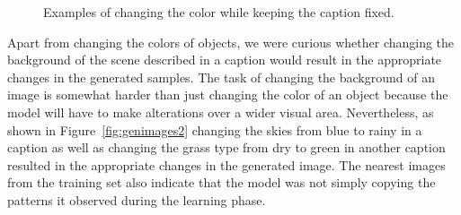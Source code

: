 \documentclass{article} %
\begin{document}
\begin{figure}[!h]
\captionsetup[subfigure]{labelformat=empty}
\begin{center}
\quad
%
\quad
%
\quad
%
\quad
%
\end{center}
\caption{Examples of changing the color while keeping the caption fixed.}
\label{fig:genimages1}
\vspace{-0.6cm}
\end{figure}

Apart from changing the colors of objects, we were curious whether changing the background of the scene described in a caption would result in the appropriate changes in the generated samples. The task of changing the background of an image is somewhat harder than just changing the color of an object because the model will have to make alterations over a wider visual area. Nevertheless, as shown in Figure~\ref{fig:genimages2} changing the skies from blue to rainy in a caption as well as changing the grass type from dry to green in another caption resulted in the appropriate changes in the generated image. The nearest images from the training set also indicate that the model was not simply copying the patterns it observed during the learning phase.
\end{document}
